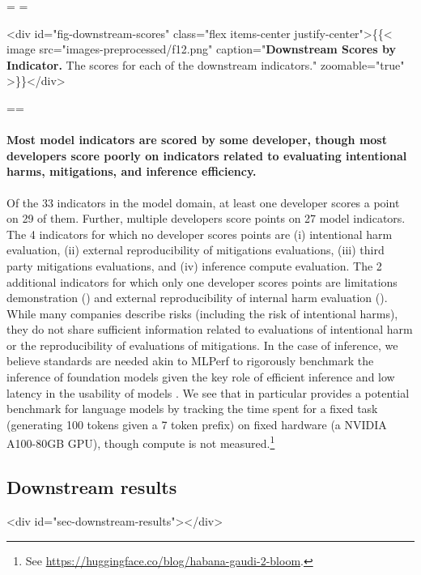 \documentclass[screen, authorversion, acmsmall]{acmart}
\begin{document}
\eject
\pdfpageheight=\originalwidth
\setlength{\mylength}{\originalheight-3.4cm}
\pdfpagewidth=\mylength
{}

<div id="fig-downstream-scores" class="flex items-center justify-center">\{\{< image src="images-preprocessed/f12.png" caption="\textbf{Downstream Scores by Indicator.}  The scores for each of the \numdownstreamindicators downstream indicators." zoomable="true" >\}\}</div>



\clearpage
\eject
\pdfpagewidth=\originalwidth \pdfpageheight=\originalheight
{}


\paragraph{Most model indicators are scored by some developer, though most developers score poorly on indicators related to evaluating intentional harms, mitigations, and inference efficiency.}
Of the 33 indicators in the model domain, at least one developer scores a point on 29 of them. 
Further, multiple developers score points on 27 model indicators.
The 4 indicators for which no developer scores points are (i) intentional harm evaluation, (ii) external reproducibility of mitigations evaluations, (iii) third party mitigations evaluations, and (iv) inference compute evaluation.
The 2 additional indicators for which only one developer scores points are limitations demonstration (\cohere) and external reproducibility of internal harm evaluation (\openai).
While many companies describe risks (including the risk of intentional harms), they do not share sufficient information related to evaluations of intentional harm or the reproducibility of evaluations of mitigations.
In the case of inference, we believe standards are needed akin to MLPerf \citep{reddi2020mlperf} to rigorously benchmark the inference of foundation models \citep{narayanan2023cheaply} given the key role of efficient inference and low latency in the usability of models \citep{lee2023evaluating}.
We see that \bloomz in particular provides a potential benchmark for language models by tracking the time spent for a fixed task (generating 100 tokens given a 7 token prefix) on fixed hardware (a NVIDIA A100-80GB GPU), though compute is not measured.\footnote{See \url{https://huggingface.co/blog/habana-gaudi-2-bloom}.}

\hypertarget{downstream-results}{\subsection{Downstream results}}
<div id="sec-downstream-results"></div>
\end{document}
